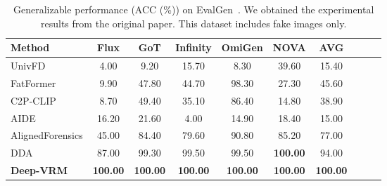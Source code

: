 \documentclass{article}
\theoremstyle{plain}
\theoremstyle{definition}
\theoremstyle{remark}
\begin{document}
\begin{table}
  \centering
  \caption{Generalizable performance (ACC (\%)) on EvalGen~\citep{chen2025dual}. We obtained the experimental results from the original paper. This dataset includes fake images only.}
  \label{tab:evalgen}
  \footnotesize
  \setlength{\tabcolsep}{18pt}
  \begin{tabular}{l|ccccccccc}
    \toprule
    Method &Flux &GoT &Infinity &OmiGen &NOVA &\textbf{AVG} \\
    \midrule
    UnivFD &4.00 &9.20 &15.70 &8.30 &39.60 &15.40 \\
    FatFormer &9.90 &47.80 &44.70 &98.30 &27.30 &45.60 \\
    C2P-CLIP &8.70 &49.40 &35.10 &86.40 &14.80 &38.90 \\
    AIDE &16.20 &21.60 &4.00 &14.90 &18.40 &15.00 \\
    AlignedForensics &45.00 &84.40 &79.60 &90.80 &85.20 &77.00 \\
    DDA &87.00 &99.30 &99.50 &{99.50} &\textbf{100.00} &94.00 \\
    \midrule

    \rowcolor{blue!3}  \textbf{Deep-VRM} &\textbf{100.00} &\textbf{100.00} &\textbf{100.00} &\textbf{100.00} &\textbf{100.00} &\textbf{100.00} \\
    
    \bottomrule
  \end{tabular}
\end{table}
\end{document}
